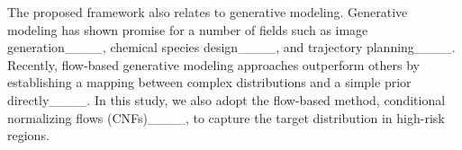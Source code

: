
The proposed framework also relates to generative modeling. Generative modeling has shown promise for a number of fields such as image generation____, chemical species design____, and trajectory planning____. Recently, flow-based generative modeling approaches outperform others by establishing a mapping between complex distributions and a simple prior directly____. In this study, we also adopt the flow-based method, conditional normalizing flows (CNFs)____, to capture the target distribution in high-risk regions.